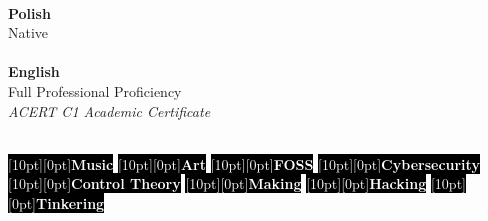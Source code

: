 \documentclass[9pt]{./src/packages/Developer_CV/developercv}
\begin{document}

\vfill

\begin{minipage}[t]{0.5\textwidth}
    \\
    \textbf{Polish}\\Native\\ \\
    \textbf{English}\\Full Professional Proficiency \\
    \textit{ACERT C1 Academic Certificate}
\end{minipage}
\hfill
\begin{minipage}[t]{0.5\textwidth}
    \raggedright %
    \\
    \colorbox{black}{\textcolor{white}{\raisebox{0.5ex}[10pt][0pt]{\textbf{Music}}}}
    \colorbox{black}{\textcolor{white}{\raisebox{0.5ex}[10pt][0pt]{\textbf{Art}}}}
    \colorbox{black}{\textcolor{white}{\raisebox{0.5ex}[10pt][0pt]{\textbf{FOSS}}}}
    \colorbox{black}{\textcolor{white}{\raisebox{0.5ex}[10pt][0pt]{\textbf{Cybersecurity}}}}
    \colorbox{black}{\textcolor{white}{\raisebox{0.5ex}[10pt][0pt]{\textbf{Control Theory}}}}
    \colorbox{black}{\textcolor{white}{\raisebox{0.5ex}[10pt][0pt]{\textbf{Making}}}}
    \colorbox{black}{\textcolor{white}{\raisebox{0.5ex}[10pt][0pt]{\textbf{Hacking}}}}
    \colorbox{black}{\textcolor{white}{\raisebox{0.5ex}[10pt][0pt]{\textbf{Tinkering}}}}
\end{minipage}


\end{document}
